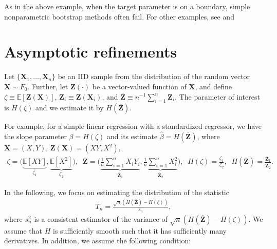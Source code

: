 \documentclass[10.5pt, A4paper, openany, uplatex]{book}
\newcommand{\mbf}{\mathbf}
\newcommand{\E}{\mathbb{E}}
\renewcommand{\hat}{\widehat}
\renewcommand{\bar}{\overline}
\numberwithin{equation}{section}
\begin{document}
As in the above example, when the target parameter is on a boundary, simple nonparametric bootstrap methods often fail.
For other examples, see \cite{HOROWITZ20013159} and \cite{horowitz2019bootstrap}

\section{Asymptotic refinements}

Let $\{\mbf{X}_1, \ldots, \mbf{X}_n\}$ be an IID sample from the distribution of the random vector $\mbf{X} \sim F_0$.
Further, let $\mbf{Z}(\cdot)$ be a vector-valued function of $\mbf{X}$, and define $\zeta \equiv \E [\mbf{Z}(\mbf{X})]$, $\mbf{Z}_i \equiv \mbf{Z}(\mbf{X}_i)$, and $\bar{\mbf{Z}} \equiv n^{-1} \sum_{i = 1}^n \mbf{Z}_i$.
The parameter of interest is $H(\zeta)$ and we estimate it by $H(\bar{\mbf{Z}})$.

For example, for a simple linear regression with a standardized regressor, we have the slope parameter $\beta = H(\zeta)$ and its estimate $\hat \beta = H(\bar{\mbf{Z}})$, where $\mbf{X} = (X, Y)$, $\mbf{Z}(\mbf{X}) = (X Y , X^2 )$, 
\begin{align*}
	\zeta = \biggl(\underbrace{\E[XY]}_{\zeta_1}, \underbrace{\E[X^2]}_{\zeta_2}\biggr), 
	\;\; \bar{\mbf{Z}} = \biggl(\underbrace{\frac{1}{n} \sum_{i = 1}^n X_i Y_i}_{\bar{\mbf{Z}}_1}, \underbrace{\frac{1}{n} \sum_{i = 1}^n X_i^2}_{\bar{\mbf{Z}}_2} \biggr),
	\;\;
	H(\zeta) = \frac{\zeta_1}{\zeta_2}, 
	\;\;  H(\bar{\mbf{Z}}) = \frac{\bar{\mbf{Z}}_1}{\bar{\mbf{Z}}_2}.
\end{align*}

In the following, we focus on estimating the distribution of the statistic
\begin{align*}
	T_n = \frac{\sqrt{n}(H(\bar{\mbf{Z}}) - H(\zeta))}{s_n},
\end{align*}
where $s_n^2$ is a consistent estimator of the variance of $\sqrt{n}(H(\bar{\mbf{Z}}) - H(\zeta))$.
We assume that $H$ is sufficiently smooth such that it has sufficiently many derivatives.
In addition, we assume the following condition:
\end{document}
